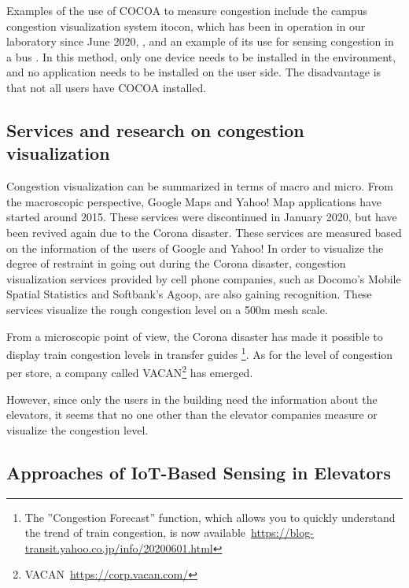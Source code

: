 Examples of the use of COCOA to measure congestion include the campus congestion visualization system itocon, which has been in operation in our laboratory since June 2020, \cite{research_itocon}, and an example of its use for sensing congestion in a bus \cite{kanamitu-2021-dicomo}. In this method, only one device needs to be installed in the environment, and no application needs to be installed on the user side. The disadvantage is that not all users have COCOA installed.


\subsection{Services and research on congestion visualization}

Congestion visualization can be summarized in terms of macro and micro. From the macroscopic perspective, Google Maps and Yahoo! Map applications have started around 2015. These services were discontinued in January 2020, but have been revived again due to the Corona disaster. These services are measured based on the information of the users of Google and Yahoo! In order to visualize the degree of restraint in going out during the Corona disaster, congestion visualization services provided by cell phone companies, such as Docomo's Mobile Spatial Statistics and Softbank's Agoop, are also gaining recognition. These services visualize the rough congestion level on a 500m mesh scale.

\thispagestyle{guusuu}

From a microscopic point of view, the Corona disaster has made it possible to display train congestion levels in transfer guides \footnote{The ''Congestion Forecast'' function, which allows you to quickly understand the trend of train congestion, is now available~\url{https://blog-transit.yahoo.co.jp/info/20200601.html}}. As for the level of congestion per store, a company called VACAN\footnote{VACAN~\url{https://corp.vacan.com/}} has emerged.

However, since only the users in the building need the information about the elevators, it seems that no one other than the elevator companies measure or visualize the congestion level.


\subsection{Approaches of IoT-Based Sensing in Elevators}

